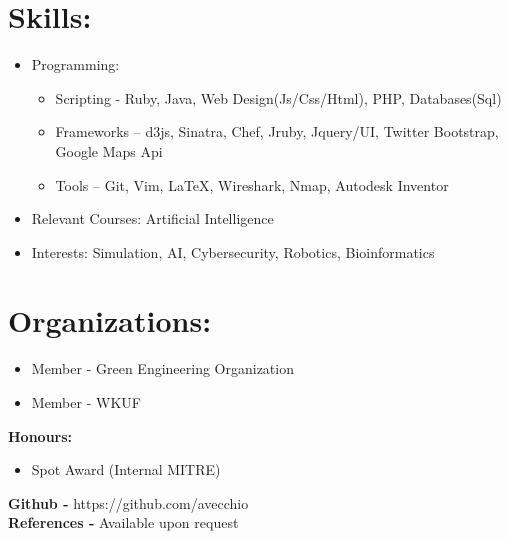 \documentclass{res}
\begin{document}
\section{Skills:}
\begin{itemize}
\item Programming:
\begin{itemize}[label=$\circ$]
\item Scripting - Ruby, Java, Web Design(Js/Css/Html), PHP, Databases(Sql)%
\item Frameworks – d3js, Sinatra, Chef, Jruby, Jquery/UI, Twitter Bootstrap, Google Maps Api%
\item Tools – Git, Vim, \LaTeX, Wireshark, Nmap, Autodesk Inventor
\end{itemize}
\item Relevant Courses: Artificial Intelligence
\item Interests: Simulation, AI, Cybersecurity, Robotics, Bioinformatics
\end{itemize}
\section{Organizations:}
\begin{itemize}
\item Member - Green Engineering Organization
\item Member - WKUF
\end{itemize}

\textbf{Honours:}
\begin{itemize}
\item Spot Award (Internal MITRE)
\end{itemize}

\begin{center}
\textbf{Github - }https://github.com/avecchio\\
\textbf{References - }Available upon request
\end{center}
\end{document}
